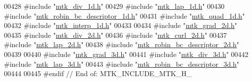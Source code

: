 \begin{DoxyCode}
00428 \textcolor{preprocessor}{#include "\hyperlink{mtk__div__1d_8h}{mtk\_div\_1d.h}"}
00429 \textcolor{preprocessor}{#include "\hyperlink{mtk__lap__1d_8h}{mtk\_lap\_1d.h}"}
00430 \textcolor{preprocessor}{#include "\hyperlink{mtk__robin__bc__descriptor__1d_8h}{mtk\_robin\_bc\_descriptor\_1d.h}"}
00431 \textcolor{preprocessor}{#include "\hyperlink{mtk__quad__1d_8h}{mtk\_quad\_1d.h}"}
00432 \textcolor{preprocessor}{#include "\hyperlink{mtk__interp__1d_8h}{mtk\_interp\_1d.h}"}
00433 
00434 \textcolor{preprocessor}{#include "\hyperlink{mtk__grad__2d_8h}{mtk\_grad\_2d.h}"}
00435 \textcolor{preprocessor}{#include "\hyperlink{mtk__div__2d_8h}{mtk\_div\_2d.h}"}
00436 \textcolor{preprocessor}{#include "\hyperlink{mtk__curl__2d_8h}{mtk\_curl\_2d.h}"}
00437 \textcolor{preprocessor}{#include "\hyperlink{mtk__lap__2d_8h}{mtk\_lap\_2d.h}"}
00438 \textcolor{preprocessor}{#include "\hyperlink{mtk__robin__bc__descriptor__2d_8h}{mtk\_robin\_bc\_descriptor\_2d.h}"}
00439 
00440 \textcolor{preprocessor}{#include "\hyperlink{mtk__grad__3d_8h}{mtk\_grad\_3d.h}"}
00441 \textcolor{preprocessor}{#include "\hyperlink{mtk__div__3d_8h}{mtk\_div\_3d.h}"}
00442 \textcolor{preprocessor}{#include "\hyperlink{mtk__lap__3d_8h}{mtk\_lap\_3d.h}"}
00443 \textcolor{preprocessor}{#include "\hyperlink{mtk__robin__bc__descriptor__3d_8h}{mtk\_robin\_bc\_descriptor\_3d.h}"}
00444 
00445 \textcolor{preprocessor}{#endif // End of: MTK\_INCLUDE\_MTK\_H\_}
\end{DoxyCode}
